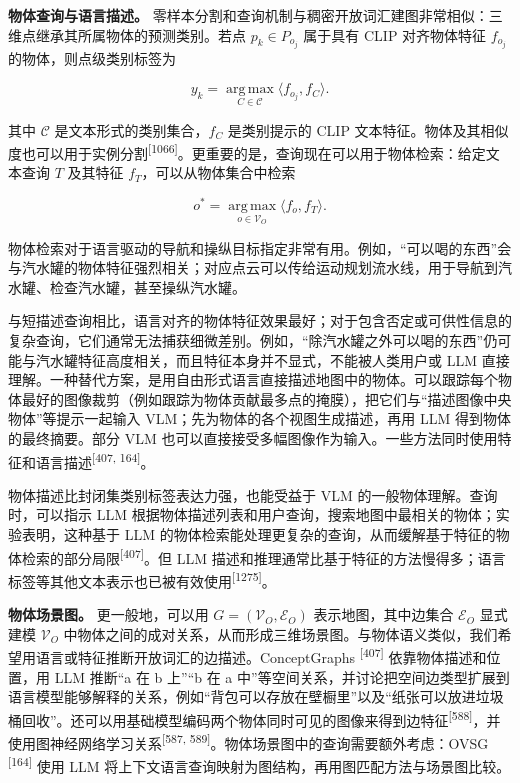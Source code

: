 \textbf{物体查询与语言描述。} 零样本分割和查询机制与稠密开放词汇建图非常相似：三维点继承其所属物体的预测类别。若点 $p_k\in P_{o_j}$ 属于具有 CLIP 对齐物体特征 $f_{o_j}$ 的物体，则点级类别标签为

\begin{equation*}
y_k=\operatorname*{arg\,max}_{C\in\mathcal{C}}\langle f_{o_j},f_C\rangle.
\end{equation*}

其中 $\mathcal{C}$ 是文本形式的类别集合，$f_C$ 是类别提示的 CLIP 文本特征。物体及其相似度也可以用于实例分割\textsuperscript{[1066]}。更重要的是，查询现在可以用于物体检索：给定文本查询 $T$ 及其特征 $f_T$，可以从物体集合中检索

\begin{equation*}
o^*=\operatorname*{arg\,max}_{o\in\mathcal{V}_O}\langle f_o,f_T\rangle.
\end{equation*}

物体检索对于语言驱动的导航和操纵目标指定非常有用。例如，“可以喝的东西”会与汽水罐的物体特征强烈相关；对应点云可以传给运动规划流水线，用于导航到汽水罐、检查汽水罐，甚至操纵汽水罐。

与短描述查询相比，语言对齐的物体特征效果最好；对于包含否定或可供性信息的复杂查询，它们通常无法捕获细微差别。例如，“除汽水罐之外可以喝的东西”仍可能与汽水罐特征高度相关，而且特征本身并不显式，不能被人类用户或 LLM 直接理解。一种替代方案，是用自由形式语言直接描述地图中的物体。可以跟踪每个物体最好的图像裁剪（例如跟踪为物体贡献最多点的掩膜），把它们与“描述图像中央物体”等提示一起输入 VLM；先为物体的各个视图生成描述，再用 LLM 得到物体的最终摘要。部分 VLM 也可以直接接受多幅图像作为输入。一些方法同时使用特征和语言描述\textsuperscript{[407, 164]}。

物体描述比封闭集类别标签表达力强，也能受益于 VLM 的一般物体理解。查询时，可以指示 LLM 根据物体描述列表和用户查询，搜索地图中最相关的物体；实验表明，这种基于 LLM 的物体检索能处理更复杂的查询，从而缓解基于特征的物体检索的部分局限\textsuperscript{[407]}。但 LLM 描述和推理通常比基于特征的方法慢得多；语言标签等其他文本表示也已被有效使用\textsuperscript{[1275]}。

\textbf{物体场景图。} 更一般地，可以用 $G=(\mathcal{V}_O,\mathcal{E}_O)$ 表示地图，其中边集合 $\mathcal{E}_O$ 显式建模 $\mathcal{V}_O$ 中物体之间的成对关系，从而形成三维场景图。与物体语义类似，我们希望用语言或特征推断开放词汇的边描述。ConceptGraphs \textsuperscript{[407]} 依靠物体描述和位置，用 LLM 推断“a 在 b 上”“b 在 a 中”等空间关系，并讨论把空间边类型扩展到语言模型能够解释的关系，例如“背包可以存放在壁橱里”以及“纸张可以放进垃圾桶回收”。还可以用基础模型编码两个物体同时可见的图像来得到边特征\textsuperscript{[588]}，并使用图神经网络学习关系\textsuperscript{[587, 589]}。物体场景图中的查询需要额外考虑：OVSG \textsuperscript{[164]} 使用 LLM 将上下文语言查询映射为图结构，再用图匹配方法与场景图比较。

